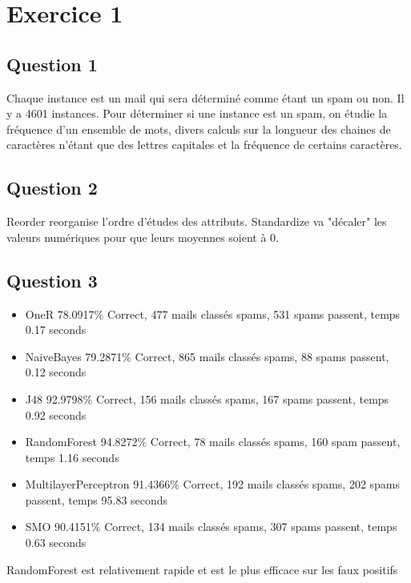 \documentclass[11pt,a4paper,utf8x]{report}
\begin{document}
\chapter{Exercice 1}
\section{Question 1}
Chaque instance est un mail qui sera déterminé comme étant un spam ou non. Il y a 4601 instances. Pour déterminer si une instance est un spam, on étudie la fréquence d'un ensemble de mots, divers calculs sur la longueur des chaines de caractères n'étant que des lettres capitales et la fréquence de certains caractères.
\section{Question 2}
Reorder reorganise l'ordre d'études des attributs.
Standardize va "décaler" les valeurs numériques pour que leurs moyennes soient à 0.
\section{Question 3}
\begin{itemize}
\item{OneR} 78.0917\% Correct, 477 mails classés spams, 531 spams passent, temps 0.17 seconds
\item{NaiveBayes} 79.2871\% Correct, 865 mails classés spams, 88 spams passent, 0.12 seconds
\item{J48} 92.9798\% Correct, 156 mails classés spams, 167 spams passent, temps 0.92 seconds
\item{RandomForest} 94.8272\% Correct, 78 mails classés spams, 160 spam passent, temps 1.16 seconds
\item{MultilayerPerceptron} 91.4366\% Correct, 192 mails classés spams, 202 spams passent, temps 95.83 seconds
\item{SMO} 90.4151\% Correct, 134 mails classés spams, 307 spams passent, temps 0.63 seconds
\end{itemize}
RandomForest est relativement rapide et est le plus efficace sur les faux positifs
\end{document}
